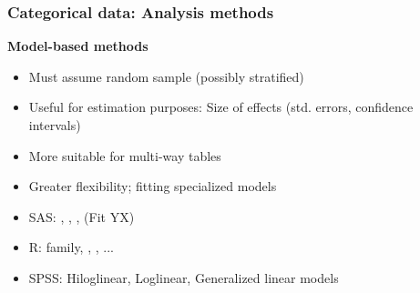 \begin{frame}
	\frametitle{Categorical data: Analysis methods}

\begin{block}{\large\bfseries Model-based methods}
    \begin{itemize}
    \item Must assume random sample (possibly stratified)
    \item Useful for \alert{estimation} purposes: Size of effects (std. errors, confidence intervals)
    \item More suitable for \alert{multi-way} tables
    \item Greater flexibility; fitting specialized models
    \item SAS: , ,  ,  (Fit YX)
    \item R:  family, , , ...
	\item SPSS: Hiloglinear, Loglinear, Generalized linear models
    \end{itemize}
\end{block}
\end{frame}

